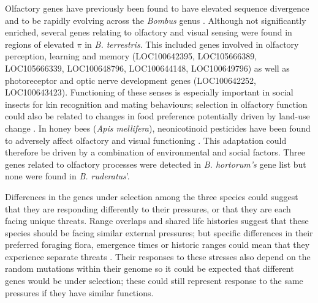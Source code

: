 \documentclass[12pt]{article}
\begin{document}
\begin{linenumbers}
    	
    	Olfactory genes have previously been found to have elevated sequence divergence and to be rapidly evolving across the \emph{Bombus} genus \citep{sun_genus-wide_2021}. Although not significantly enriched, several genes relating to olfactory and visual sensing were found in regions of elevated $\pi$ in \emph{B. terrestris}. 
    	This included genes involved in olfactory perception, learning and memory (LOC100642395, LOC105666389, LOC105666339, LOC100648796, LOC100644148, LOC100649796) as well as photoreceptor and optic nerve development genes (LOC100642252, LOC100643423). 
    	Functioning of these senses is especially important in social insects for kin recognition and mating behaviours; selection in olfactory function could also be related to changes in food preference potentially driven by land-use change \citep{ayasse_mating_2001, sun_genus-wide_2021}. In honey bees (\emph{Apis mellifera}), neonicotinoid pesticides have been found to adversely affect olfactory and visual functioning \citep{roat_using_2020}.
    	This adaptation could therefore be driven by a combination of environmental and social factors. 
    	Three genes related to olfactory processes were detected in \emph{B. hortorum's} gene list but none were found in \emph{B. ruderatus}'.
    	
    	
    	Differences in the genes under selection among the three species could suggest that they are responding differently to their pressures, or that they are each facing unique threats. Range overlaps and shared life histories suggest that these species should be facing similar external pressures; but specific differences in their preferred foraging flora, emergence times or historic ranges could mean that they experience separate threats \citep{powney_widespread_2019}. Their responses to these stresses also depend on the random mutations within their genome so it could be expected that different genes would be under selection; these could still represent response to the same pressures if they have similar functions.
    	
    	

\end{linenumbers}
\end{document}
